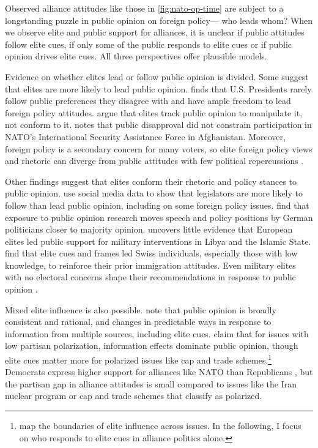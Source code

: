 \documentclass[12pt]{article}
\begin{document}
Observed alliance attitudes like those in \autoref{fig:nato-op-time} are subject to a longstanding puzzle in public opinion on foreign policy--- who leads whom? 
When we observe elite and public support for alliances, it is unclear if public attitudes follow elite cues, if only some of the public responds to elite cues or if public opinion drives elite cues. 
All three perspectives offer plausible models. 


Evidence on whether elites lead or follow public opinion is divided.
Some suggest that elites are more likely to lead public opinion. 
\citet{Canes-Wrone2006} finds that U.S. Presidents rarely follow public preferences they disagree with and have ample freedom to lead foreign policy attitudes. 
\citet{JacobsShapiro2000} argue that elites track public opinion to manipulate it, not conform to it. 
\citet{Kreps2010} notes that public disapproval did not constrain participation in NATO's International Security Assistance Force in Afghanistan. 
Moreover, foreign policy is a secondary concern for many voters, so elite foreign policy views and rhetoric can diverge from public attitudes with few political repercussions \citep{BusbyMonten2012}. 


Other findings suggest that elites conform their rhetoric and policy stances to public opinion. 
\citet{Barberaetal2019} use social media data to show that legislators are more likely to follow than lead public opinion, including on some foreign policy issues. 
\citet{HagerHilbig2020} find that exposure to public opinion research moves speech and policy positions by German politicians closer to majority opinion. 
\citet{Haesebrouck2019} uncovers little evidence that European elites led public support for military interventions in Libya and the Islamic State. 
\citet{Bechteletal2015} find that elite cues and frames led Swiss individuals, especially those with low knowledge, to reinforce their prior immigration attitudes. 
Even military elites with no electoral concerns shape their recommendations in response to public opinion \citep{LinGreenberg2021}. 


Mixed elite influence is also possible. 
\citet{PageShapiro1992} note that public opinion is broadly consistent and rational, and changes in predictable ways in response to information from multiple sources, including elite cues. 
\citet{GuisingerSaunders2017} claim that for issues with low partisan polarization, information effects dominate public opinion, though elite cues matter more for polarized issues like cap and trade schemes.\footnote{\citet{GuisingerSaunders2017} map the boundaries of elite influence across issues. In the following, I focus on who responds to elite cues in alliance politics alone.}
Democrats express higher support for alliances like NATO than Republicans \citep{PewNATO2020}, but the partisan gap in alliance attitudes is small compared to issues like the Iran nuclear program or cap and trade schemes that \citet{GuisingerSaunders2017} classify as polarized. 
\end{document}
